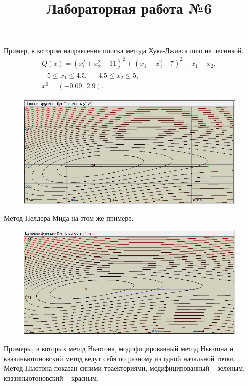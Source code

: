 \documentclass[12pt,a4paper]{article}
\begin{document}
\title{\textbf{Лабораторная работа №6}}
\author{}
\date{}
\maketitle

Пример, в котором направление поиска метода Хука-Дживса шло не лесинкой.
\begin{gather*}
    Q(x) = (x_1^2+x_2^2-11)^2 + (x_1+x_2^2-7)^2+x_1-x_2,\\
    -5 \le x_1 \le 4.5, \; -4.5 \le x_2 \le 5,\\
    x^0=(-0.09, \; 2.9).
\end{gather*}

\begin{figure}[H]
    \centering
    \includegraphics{img/hj.png}
\end{figure}

Метод Нелдера-Мида на этом же примере.

\begin{figure}[H]
    \centering
    \includegraphics{img/nm.png}
\end{figure}

Примеры, в которых метод Ньютона, модифицированный метод Ньютона и квазиньютоновский метод ведут себя по разному из одной начальной точки. Метод Ньютона показан синими траекториями, модифицированный -- зелёным, квазиньютоновский -- красным.
\end{document}
